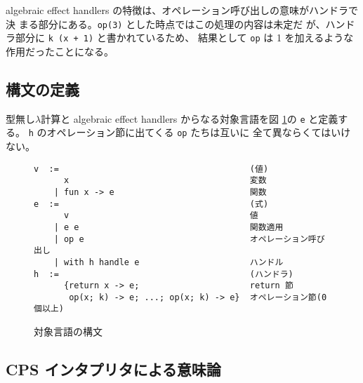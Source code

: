 algebraic effect handlers の特徴は、オペレーション呼び出しの意味がハンドラで決
まる部分にある。\texttt{op(3)} とした時点ではこの処理の内容は未定だ
が、ハンドラ部分に \texttt{k (x + 1)} と書かれているため、
結果として \texttt{op} は 1 を加えるような作用だったことになる。

\subsection{構文の定義}
\label{subsection:syntax}
型無し$\lambda$計算と algebraic effect handlers からなる対象言語を図 \ref{figure:abstract_syntax}の \texttt{e} と定義する。
\texttt{h} のオペレーション節に出てくる \texttt{op} たちは互いに
全て異ならくてはいけない。


\begin{figure}[t]
\begin{verbatim}
v  :=                                      (値)
      x                                    変数
    | fun x -> e                           関数
e  :=                                      (式)
      v                                    値
    | e e                                  関数適用
    | op e                                 オペレーション呼び出し
    | with h handle e                      ハンドル
h  :=                                      (ハンドラ)
      {return x -> e;                      return 節
       op(x; k) -> e; ...; op(x; k) -> e}  オペレーション節(0個以上)
\end{verbatim}
\caption{対象言語の構文}
\label{figure:abstract_syntax}
\end{figure}



\subsection{CPS インタプリタによる意味論}
\label{subsection:1cps}

